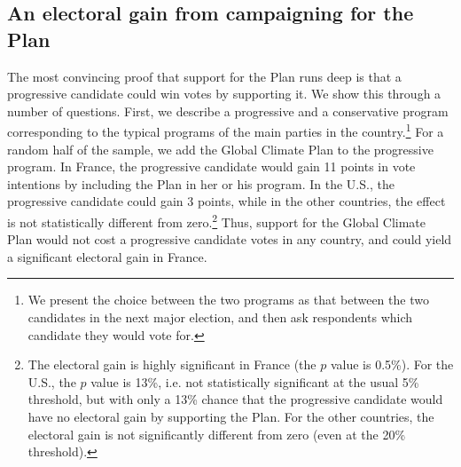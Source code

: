 \documentclass[a5paper,english,openany]{memoir}
\begin{document}
\subsection{An electoral gain from campaigning for the Plan}
The most convincing proof that support for the Plan runs deep is that a progressive candidate could win votes by supporting it. We show this through a number of questions. First, we describe a progressive and a conservative program corresponding to the typical programs of the main parties in the country.\footnote{We present the choice between the two programs as that between the two candidates in the next major election, %
and then ask respondents which candidate they would vote for.} For a random half of the sample, we add the Global Climate Plan to the progressive program. In France, the progressive candidate would gain 11 points in vote intentions by including the Plan in her or his program. In the U.S., the progressive candidate could gain 3 points, while in the other countries, the effect is not statistically different from zero.\footnote{The electoral gain is highly significant in France (the $p$ value is 0.5\%). For the U.S., the $p$ value is 13\%, i.e. not statistically significant at the usual 5\% threshold, but with only a 13\% chance that the progressive candidate would have no electoral gain by supporting the Plan. For the other countries, the electoral gain is not significantly different from zero (even at the 20\% threshold).} 
Thus, support for the Global Climate Plan would not cost a progressive candidate votes in any country, and could yield a significant electoral gain in France. 
\end{document}
